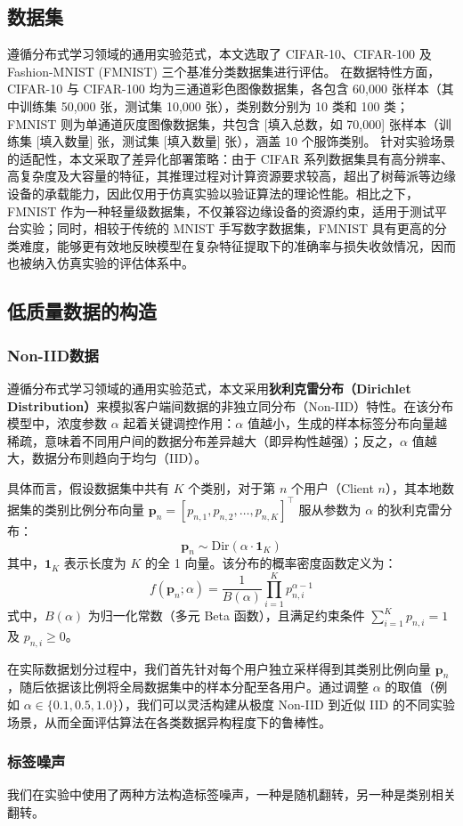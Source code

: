 \subsection{数据集}
遵循分布式学习领域的通用实验范式，本文选取了 CIFAR-10、CIFAR-100 及 Fashion-MNIST (FMNIST) 三个基准分类数据集进行评估。
在数据特性方面，CIFAR-10 与 CIFAR-100 均为三通道彩色图像数据集，各包含 60,000 张样本（其中训练集 50,000 张，测试集 10,000 张），类别数分别为 10 类和 100 类；FMNIST 则为单通道灰度图像数据集，共包含 [填入总数，如 70,000] 张样本（训练集 [填入数量] 张，测试集 [填入数量] 张），涵盖 10 个服饰类别。
针对实验场景的适配性，本文采取了差异化部署策略：由于 CIFAR 系列数据集具有高分辨率、高复杂度及大容量的特征，其推理过程对计算资源要求较高，超出了树莓派等边缘设备的承载能力，因此仅用于仿真实验以验证算法的理论性能。相比之下，FMNIST 作为一种轻量级数据集，不仅兼容边缘设备的资源约束，适用于测试平台实验；同时，相较于传统的 MNIST 手写数字数据集，FMNIST 具有更高的分类难度，能够更有效地反映模型在复杂特征提取下的准确率与损失收敛情况，因而也被纳入仿真实验的评估体系中。

\subsection{低质量数据的构造}
\subsubsection{Non-IID数据}
遵循分布式学习领域的通用实验范式，本文采用\textbf{狄利克雷分布（Dirichlet Distribution）}来模拟客户端间数据的非独立同分布（Non-IID）特性。在该分布模型中，浓度参数 $\alpha$ 起着关键调控作用：$\alpha$ 值越小，生成的样本标签分布向量越稀疏，意味着不同用户间的数据分布差异越大（即异构性越强）；反之，$\alpha$ 值越大，数据分布则趋向于均匀（IID）。

具体而言，假设数据集中共有 $K$ 个类别，对于第 $n$ 个用户（Client $n$），其本地数据集的类别比例分布向量 $\mathbf{p}_n = [p_{n,1}, p_{n,2}, \dots, p_{n,K}]^\top$ 服从参数为 $\alpha$ 的狄利克雷分布：
\begin{equation}
    \mathbf{p}_n \sim \text{Dir}(\alpha \cdot \mathbf{1}_K)
\end{equation}
其中，$\mathbf{1}_K$ 表示长度为 $K$ 的全 1 向量。该分布的概率密度函数定义为：
\begin{equation}
    f(\mathbf{p}_n; \alpha) = \frac{1}{B(\alpha)} \prod_{i=1}^{K} p_{n,i}^{\alpha - 1}
\end{equation}
式中，$B(\alpha)$ 为归一化常数（多元 Beta 函数），且满足约束条件 $\sum_{i=1}^{K} p_{n,i} = 1$ 及 $p_{n,i} \geq 0$。

在实际数据划分过程中，我们首先针对每个用户独立采样得到其类别比例向量 $\mathbf{p}_n$，随后依据该比例将全局数据集中的样本分配至各用户。通过调整 $\alpha$ 的取值（例如 $\alpha \in \{0.1, 0.5, 1.0\}$），我们可以灵活构建从极度 Non-IID 到近似 IID 的不同实验场景，从而全面评估算法在各类数据异构程度下的鲁棒性。

\subsubsection{标签噪声}
我们在实验中使用了两种方法构造标签噪声，一种是随机翻转，另一种是类别相关翻转。

